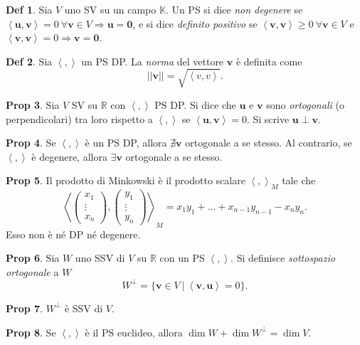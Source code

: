 \documentclass[]{article}
\newcommand{\bl}[1]{\mathbf{#1}}
\newcommand{\vu}{\mathbf{u}}
\newcommand{\vv}{\mathbf{v}}
\newcommand{\scalprod}[2]{\left\langle #1 , #2 \right\rangle}
\theoremstyle{definition}
\theoremstyle{definition}
\newtheorem{prop}{Prop}[subsection]
\theoremstyle{definition}
\newtheorem{dfn}[prop]{Def}
\begin{document}
\begin{dfn} Sia $V$ uno SV su un campo $\mathbb{K}$. Un PS si dice \emph{non degenere} se $\scalprod{\vu}{\vv}=0 \ \forall \vv \in V \Rightarrow \vu = \bl{0}$, e si dice \emph{definito positivo} se $\scalprod{\vv}{\vv} \geq 0\ \forall \vv \in V$ e  $\scalprod{\vv}{\vv} = 0 \Rightarrow \vv = \bl{0}$.

\end{dfn} \begin{dfn} Sia $\scalprod{}{}$ un PS DP. La \emph{norma} del vettore $\vv$ è definita come
$$|| \vv || = \sqrt{\scalprod{v}{v}}.$$

\end{dfn} \begin{prop} Sia $V$ SV su $\mathbb{R}$ con $\scalprod{}{}$ PS DP. Si dice che $\vu$ e $\vv$ sono \emph{ortogonali} (o perpendicolari) tra loro rispetto a $\scalprod{}{}$ se $\scalprod{\vu}{\vv}=0$. Si scrive $\vu \perp \vv$.

\end{prop} \begin{prop} Se $\scalprod{}{}$ è un PS DP, allora $\nexists \vv$ ortogonale a se stesso. Al contrario, se $\scalprod{}{}$ è degenere, allora $\exists \vv$ ortogonale a se stesso.

\end{prop} \begin{prop} Il prodotto di Minkowski è il prodotto scalare $\scalprod{}{} _M$ tale che
$$\scalprod{\begin{pmatrix} x_1 \\ \vdots \\ x_n \end{pmatrix}}{\begin{pmatrix} y_1 \\ \vdots \\ y_n \end{pmatrix}}_M =x_1 y_1 + ... + x_{n-1} y_{n-1} - x_n y_n.$$
Esso non è né DP né degenere.

\end{prop} \begin{prop} Sia $W$ uno SSV di $V$ su $\mathbb{R}$ con un PS $\scalprod{}{}$. Si definisce \emph{sottospazio ortogonale} a $W$ 
$$W^{\perp}=\{ \vv \in V \ | \ \scalprod{\vv}{\vu} = 0 \}. $$

\end{prop} \begin{prop} $W^{\perp}$ è SSV di $V$.

\end{prop} \begin{prop} Se $\scalprod{}{}$ è il PS euclideo, allora $\dim W + \dim W^{\perp} = \dim V$.


\end{prop}
\end{document}
